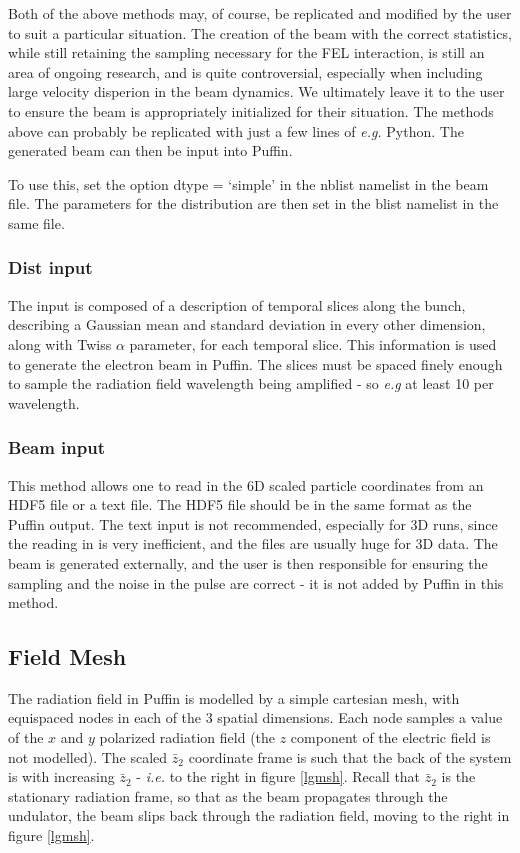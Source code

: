 \documentclass[12pt]{article}%
\begin{document}
Both of the above methods may, of course, be replicated and modified by the user to suit a particular situation. The creation of the beam with the correct statistics, while still retaining the sampling necessary for the FEL interaction, is still an area of ongoing research, and is quite controversial, especially when including large velocity disperion in the beam dynamics. We ultimately leave it to the user to ensure the beam is appropriately initialized for their situation. The methods above can probably be replicated with just a few lines of \textit{e.g.} Python. The generated beam can then be input into Puffin.

To use this, set the option dtype = `simple' in the nblist namelist in the beam file. The parameters for the distribution are then set in the blist namelist in the same file.

\subsubsection{Dist input}

The input is composed of a description of temporal slices along the bunch, describing a Gaussian mean and standard deviation in every other dimension, along with Twiss $\alpha$ parameter, for each temporal slice. This information is used to generate the electron beam in Puffin. The slices must be spaced finely enough to sample the radiation field wavelength being amplified - so \textit{e.g} at least 10 per wavelength.

\subsubsection{Beam input}

This method allows one to read in the 6D scaled particle coordinates from an HDF5 file or a text file. The HDF5 file should be in the same format as the Puffin output. The text input is not recommended, especially for 3D runs, since the reading in is very inefficient, and the files are usually huge for 3D data. The beam is generated externally, and the user is then responsible for ensuring the sampling and the noise in the pulse are correct - it is not added by Puffin in this method.


\subsection{Field Mesh}


The radiation field in Puffin is modelled by a simple cartesian mesh, with equispaced nodes in each of the 3 spatial dimensions. Each node samples a value of the $x$ and $y$ polarized radiation field (the $z$ component of the electric field is not modelled). The scaled $\bar{z}_2$ coordinate frame is such that the back of the system is with increasing $\bar{z}_2$ - \textit{i.e.} to the right in figure \ref{lgmsh}. Recall that $\bar{z}_2$ is the stationary radiation frame, so that as the beam propagates through the undulator, the beam slips back through the radiation field, moving to the right in figure \ref{lgmsh}.
\end{document}
